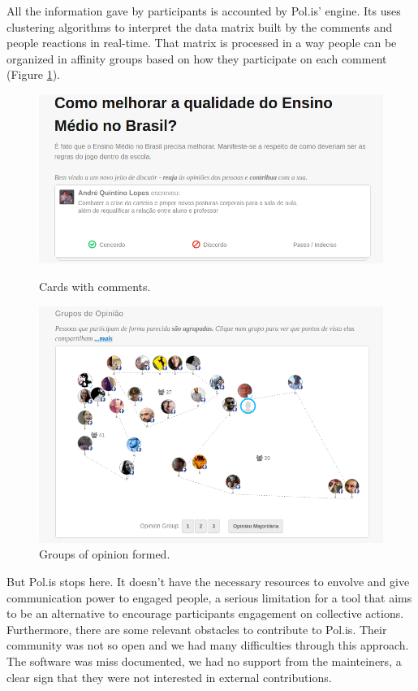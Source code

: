 \documentclass{llncs}
\begin{document}
  All the information gave by participants is accounted by Pol.is' engine.
Its uses clustering algorithms to interpret the data matrix built
by the comments and people reactions in real-time. That matrix is processed in
a way people can be organized in affinity groups based on how they participate
on each comment (Figure \ref{fig:polis-2}). 

 \begin{figure}[hbt]
   \centering
   \begin{minipage}{.50\textwidth}
     \includegraphics[width=.9\linewidth]{images/polis1.png}
     \caption{Cards with comments.}
     \label{fig:polis-1}
   \end{minipage}
   \begin{minipage}{.49\textwidth}
     \includegraphics[width=.9\linewidth]{images/polis2.png}
     \caption{Groups of opinion formed.}
     \label{fig:polis-2}
   \end{minipage}
 \end{figure}

  But Pol.is stops here. It doesn't have the necessary resources to envolve and
give communication power to engaged people, a serious limitation for a tool that
aims to be an alternative to encourage participants engagement on collective
actions. Furthermore, there are some relevant obstacles to contribute to Pol.is.
Their community was not so open and we had many difficulties through this approach.
The software was miss documented, we had no support from the mainteiners, a
clear sign that they were not interested in external contributions.
\end{document}
